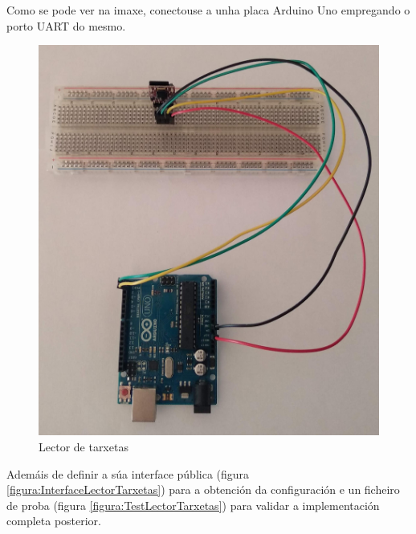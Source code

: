    Como se pode ver na imaxe, conectouse a unha placa Arduino Uno empregando
   o porto UART do mesmo. \\
  
   \begin{figure}[htbp]
    \centering
    \includegraphics[scale=0.2,keepaspectratio=true]{./imagenes/lector-tarxetas.jpg}
    \caption{Lector de tarxetas}
    \label{figura:LectorTarxetas}
   \end{figure}
   
   Ademáis de definir a súa interface pública (figura 
   \ref{figura:InterfaceLectorTarxetas}) para a obtención da configuración e un
   ficheiro de proba (figura \ref{figura:TestLectorTarxetas}) para validar a
   implementación completa posterior. \\
   

